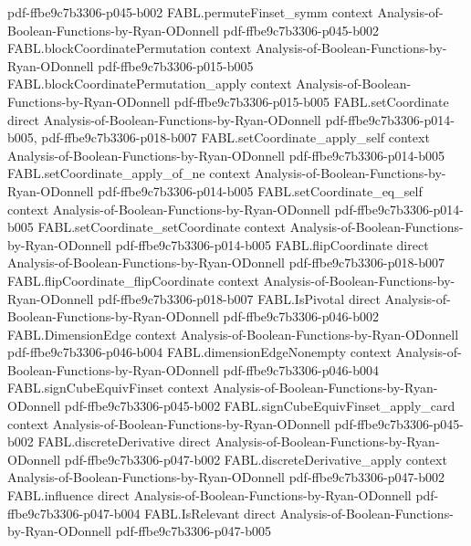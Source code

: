 \begin{theorem}
  {pdf-ffbe9c7b3306-p045-b002}
\proofstep
  {FABL.permuteFinset_symm}
  {context}
  {Analysis-of-Boolean-Functions-by-Ryan-ODonnell}
  {pdf-ffbe9c7b3306-p045-b002}
\proofstep
  {FABL.blockCoordinatePermutation}
  {context}
  {Analysis-of-Boolean-Functions-by-Ryan-ODonnell}
  {pdf-ffbe9c7b3306-p015-b005}
\proofstep
  {FABL.blockCoordinatePermutation_apply}
  {context}
  {Analysis-of-Boolean-Functions-by-Ryan-ODonnell}
  {pdf-ffbe9c7b3306-p015-b005}
\proofstep
  {FABL.setCoordinate}
  {direct}
  {Analysis-of-Boolean-Functions-by-Ryan-ODonnell}
  {pdf-ffbe9c7b3306-p014-b005,
    pdf-ffbe9c7b3306-p018-b007}
\proofstep
  {FABL.setCoordinate_apply_self}
  {context}
  {Analysis-of-Boolean-Functions-by-Ryan-ODonnell}
  {pdf-ffbe9c7b3306-p014-b005}
\proofstep
  {FABL.setCoordinate_apply_of_ne}
  {context}
  {Analysis-of-Boolean-Functions-by-Ryan-ODonnell}
  {pdf-ffbe9c7b3306-p014-b005}
\proofstep
  {FABL.setCoordinate_eq_self}
  {context}
  {Analysis-of-Boolean-Functions-by-Ryan-ODonnell}
  {pdf-ffbe9c7b3306-p014-b005}
\proofstep
  {FABL.setCoordinate_setCoordinate}
  {context}
  {Analysis-of-Boolean-Functions-by-Ryan-ODonnell}
  {pdf-ffbe9c7b3306-p014-b005}
\proofstep
  {FABL.flipCoordinate}
  {direct}
  {Analysis-of-Boolean-Functions-by-Ryan-ODonnell}
  {pdf-ffbe9c7b3306-p018-b007}
\proofstep
  {FABL.flipCoordinate_flipCoordinate}
  {context}
  {Analysis-of-Boolean-Functions-by-Ryan-ODonnell}
  {pdf-ffbe9c7b3306-p018-b007}
\proofstep
  {FABL.IsPivotal}
  {direct}
  {Analysis-of-Boolean-Functions-by-Ryan-ODonnell}
  {pdf-ffbe9c7b3306-p046-b002}
\proofstep
  {FABL.DimensionEdge}
  {context}
  {Analysis-of-Boolean-Functions-by-Ryan-ODonnell}
  {pdf-ffbe9c7b3306-p046-b004}
\proofstep
  {FABL.dimensionEdgeNonempty}
  {context}
  {Analysis-of-Boolean-Functions-by-Ryan-ODonnell}
  {pdf-ffbe9c7b3306-p046-b004}
\proofstep
  {FABL.signCubeEquivFinset}
  {context}
  {Analysis-of-Boolean-Functions-by-Ryan-ODonnell}
  {pdf-ffbe9c7b3306-p045-b002}
\proofstep
  {FABL.signCubeEquivFinset_apply_card}
  {context}
  {Analysis-of-Boolean-Functions-by-Ryan-ODonnell}
  {pdf-ffbe9c7b3306-p045-b002}
\proofstep
  {FABL.discreteDerivative}
  {direct}
  {Analysis-of-Boolean-Functions-by-Ryan-ODonnell}
  {pdf-ffbe9c7b3306-p047-b002}
\proofstep
  {FABL.discreteDerivative_apply}
  {context}
  {Analysis-of-Boolean-Functions-by-Ryan-ODonnell}
  {pdf-ffbe9c7b3306-p047-b002}
\proofstep
  {FABL.influence}
  {direct}
  {Analysis-of-Boolean-Functions-by-Ryan-ODonnell}
  {pdf-ffbe9c7b3306-p047-b004}
\proofstep
  {FABL.IsRelevant}
  {direct}
  {Analysis-of-Boolean-Functions-by-Ryan-ODonnell}
  {pdf-ffbe9c7b3306-p047-b005}

\end{theorem}
